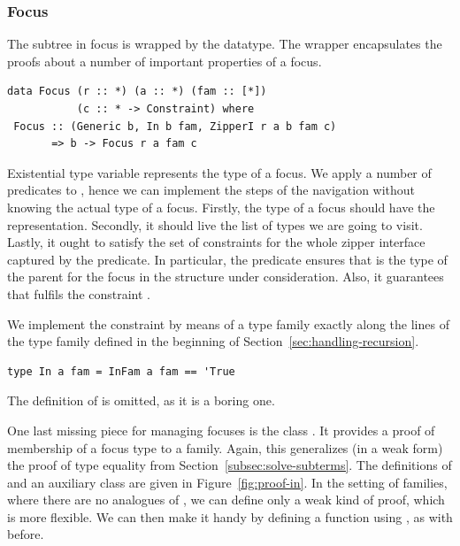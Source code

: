 \documentclass[sigplan,screen,review,anonymous]{acmart}
\begin{document}
\subsubsection{Focus}

The subtree in focus is wrapped by the  datatype. 
The wrapper encapsulates the proofs about a number of important properties of a focus.
\begin{lstlisting}[style=fancy]
data Focus (r :: *) (a :: *) (fam :: [*])
           (c :: * -> Constraint) where
 Focus :: (Generic b, In b fam, ZipperI r a b fam c)
       => b -> Focus r a fam c
\end{lstlisting}
Existential type variable  represents the type of a focus. We apply a number of predicates to , hence we can implement the steps of the navigation without knowing the actual type of a focus. Firstly, the type of a focus should have the  representation. Secondly, it should live  the list of types we are going to visit. Lastly, it ought to satisfy the set of constraints for the whole zipper interface captured by the  predicate. In particular, the predicate ensures that  is the type of the parent for the focus in the structure under consideration. Also, it guarantees that  fulfils the constraint .

We implement the  constraint by means of a type family  exactly along the lines of the  type family defined in the beginning of Section~\ref{sec:handling-recursion}. 
\begin{lstlisting}[style=fancy]
type In a fam = InFam a fam == 'True
\end{lstlisting}
The definition of  is omitted, as it is a boring one.

One last missing piece for managing focuses is the class . It provides a proof of membership of a focus type to a family. Again, this generalizes (in a weak form) the proof of type equality from Section~\ref{subsec:solve-subterms}. The definitions of  and an auxiliary class  are given in Figure~\ref{fig:proof-in}. In the setting of families, where there are no analogues of \K{:==:}, we can define only a weak kind of proof, which is more flexible. We can then make it handy by defining a function  using , as with  before.
\end{document}
